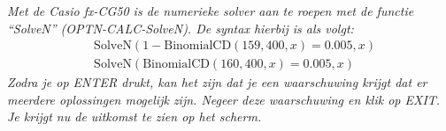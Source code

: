 {    {
        \noindent\itshape Met de Casio fx-CG50 is de numerieke solver aan te roepen met de functie \enquote{SolveN} (OPTN-CALC-SolveN). De syntax hierbij is als volgt:
        \begin{align*}
            &\text{SolveN}(1-\text{BinomialCD}(159, 400, x)=0.005,x) \\
            &\text{SolveN}(\text{BinomialCD}(160, 400, x)=0.005,x)
        \end{align*}
        Zodra je op ENTER drukt, kan het zijn dat je een waarschuwing krijgt dat er meerdere oplossingen mogelijk zijn.
        Negeer deze waarschuwing en klik op EXIT.
        Je krijgt nu de uitkomst te zien op het scherm.
    }
}
